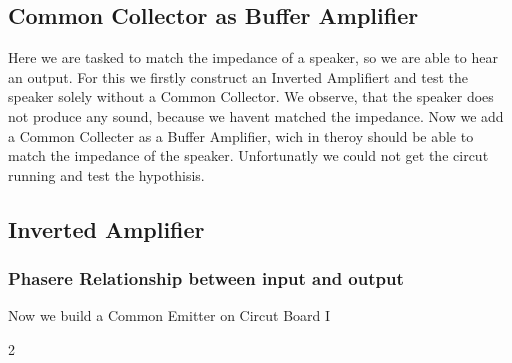 \documentclass[a4paper,10pt]{article}
\numberwithin{equation}{section}
\begin{document}
\begin{multicols}{2}
  \subsection{Common Collector as Buffer Amplifier}
  Here we are tasked to match the impedance of a speaker, so we are able to hear an output. For this we firstly construct an Inverted Amplifiert and test the speaker solely without a Common Collector. We observe, that the speaker does not produce any sound, because we havent matched the impedance. Now we add a Common Collecter as a Buffer Amplifier, wich in theroy should be able to match the impedance of the speaker. Unfortunatly we could not get the circut running and test the hypothisis. 
  \subsection{Inverted Amplifier}
  \subsubsection{Phasere Relationship between input and output}
  Now we build a Common Emitter on Circut Board I 




\end{multicols}{2}

\clearpage
\listoffigures
\listoftables



\end{document}
